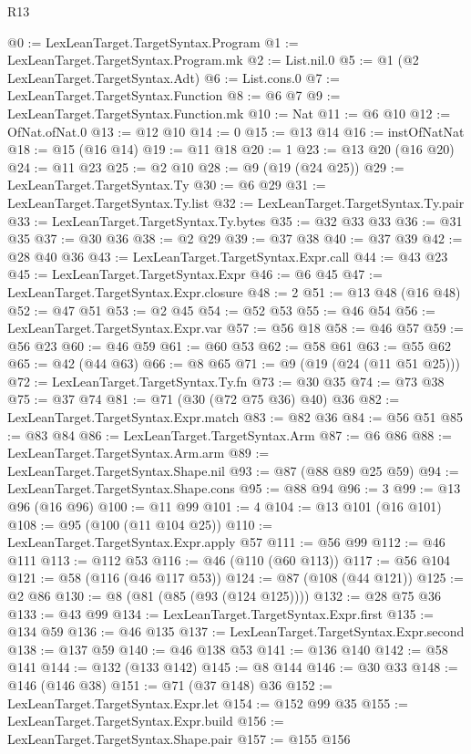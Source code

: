 \begin{lexlean}{R13}
\begin{coremodule}
@0 := LexLeanTarget.TargetSyntax.Program
@1 := LexLeanTarget.TargetSyntax.Program.mk
@2 := List.nil.{0}
@5 := @1 (@2 LexLeanTarget.TargetSyntax.Adt)
@6 := List.cons.{0}
@7 := LexLeanTarget.TargetSyntax.Function
@8 := @6 @7
@9 := LexLeanTarget.TargetSyntax.Function.mk
@10 := Nat
@11 := @6 @10
@12 := OfNat.ofNat.{0}
@13 := @12 @10
@14 := 0
@15 := @13 @14
@16 := instOfNatNat
@18 := @15 (@16 @14)
@19 := @11 @18
@20 := 1
@23 := @13 @20 (@16 @20)
@24 := @11 @23
@25 := @2 @10
@28 := @9 (@19 (@24 @25))
@29 := LexLeanTarget.TargetSyntax.Ty
@30 := @6 @29
@31 := LexLeanTarget.TargetSyntax.Ty.list
@32 := LexLeanTarget.TargetSyntax.Ty.pair
@33 := LexLeanTarget.TargetSyntax.Ty.bytes
@35 := @32 @33 @33
@36 := @31 @35
@37 := @30 @36
@38 := @2 @29
@39 := @37 @38
@40 := @37 @39
@42 := @28 @40 @36
@43 := LexLeanTarget.TargetSyntax.Expr.call
@44 := @43 @23
@45 := LexLeanTarget.TargetSyntax.Expr
@46 := @6 @45
@47 := LexLeanTarget.TargetSyntax.Expr.closure
@48 := 2
@51 := @13 @48 (@16 @48)
@52 := @47 @51
@53 := @2 @45
@54 := @52 @53
@55 := @46 @54
@56 := LexLeanTarget.TargetSyntax.Expr.var
@57 := @56 @18
@58 := @46 @57
@59 := @56 @23
@60 := @46 @59
@61 := @60 @53
@62 := @58 @61
@63 := @55 @62
@65 := @42 (@44 @63)
@66 := @8 @65
@71 := @9 (@19 (@24 (@11 @51 @25)))
@72 := LexLeanTarget.TargetSyntax.Ty.fn
@73 := @30 @35
@74 := @73 @38
@75 := @37 @74
@81 := @71 (@30 (@72 @75 @36) @40) @36
@82 := LexLeanTarget.TargetSyntax.Expr.match
@83 := @82 @36
@84 := @56 @51
@85 := @83 @84
@86 := LexLeanTarget.TargetSyntax.Arm
@87 := @6 @86
@88 := LexLeanTarget.TargetSyntax.Arm.arm
@89 := LexLeanTarget.TargetSyntax.Shape.nil
@93 := @87 (@88 @89 @25 @59)
@94 := LexLeanTarget.TargetSyntax.Shape.cons
@95 := @88 @94
@96 := 3
@99 := @13 @96 (@16 @96)
@100 := @11 @99
@101 := 4
@104 := @13 @101 (@16 @101)
@108 := @95 (@100 (@11 @104 @25))
@110 := LexLeanTarget.TargetSyntax.Expr.apply @57
@111 := @56 @99
@112 := @46 @111
@113 := @112 @53
@116 := @46 (@110 (@60 @113))
@117 := @56 @104
@121 := @58 (@116 (@46 @117 @53))
@124 := @87 (@108 (@44 @121))
@125 := @2 @86
@130 := @8 (@81 (@85 (@93 (@124 @125))))
@132 := @28 @75 @36
@133 := @43 @99
@134 := LexLeanTarget.TargetSyntax.Expr.first
@135 := @134 @59
@136 := @46 @135
@137 := LexLeanTarget.TargetSyntax.Expr.second
@138 := @137 @59
@140 := @46 @138 @53
@141 := @136 @140
@142 := @58 @141
@144 := @132 (@133 @142)
@145 := @8 @144
@146 := @30 @33
@148 := @146 (@146 @38)
@151 := @71 (@37 @148) @36
@152 := LexLeanTarget.TargetSyntax.Expr.let
@154 := @152 @99 @35
@155 := LexLeanTarget.TargetSyntax.Expr.build
@156 := LexLeanTarget.TargetSyntax.Shape.pair
@157 := @155 @156

\end{coremodule}
\end{lexlean}
